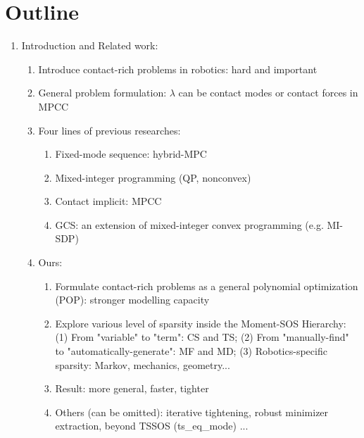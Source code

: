 
\section{Outline}
\label{sec:outline}

\begin{enumerate}
    \item Introduction and Related work: 
    \begin{enumerate}
        \item Introduce contact-rich problems in robotics: hard and important 
        \item General problem formulation: $\lambda$ can be contact modes or contact forces in MPCC 
        \item Four lines of previous researches:
        \begin{enumerate}
            \item Fixed-mode sequence: hybrid-MPC 
            \item Mixed-integer programming (QP, nonconvex)
            \item Contact implicit: MPCC 
            \item GCS: an extension of mixed-integer convex programming (e.g. MI-SDP)
        \end{enumerate}
        \item Ours:
        \begin{enumerate}
            \item Formulate contact-rich problems as a general polynomial optimization (POP): stronger modelling capacity
            \item Explore various level of sparsity inside the Moment-SOS Hierarchy: (1) From "variable" to "term": CS and TS; (2) From "manually-find" to "automatically-generate": MF and MD; (3) Robotics-specific sparsity: Markov, mechanics, geometry... 
            \item Result: more general, faster, tighter 
            \item Others (can be omitted): iterative tightening, robust minimizer extraction, beyond TSSOS (ts_eq_mode) ... 
        \end{enumerate}
    \end{enumerate}


\end{enumerate}
